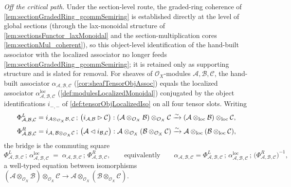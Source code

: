\begin{lemma}
  \label{lem:tensorObjAssoc_eq_localizedAssociator}
  \emph{Off the critical path.} Under the section-level route, the graded-ring
  coherence of \cref{lem:sectionGradedRing_gcommSemiring} is established directly
  at the level of global sections (through the lax-monoidal structure of
  \cref{lem:sectionsFunctor_laxMonoidal} and the section-multiplication cores
  \cref{lem:sectionMul_coherent}), so this object-level identification of the
  hand-built associator with the localized associator no longer feeds
  \cref{lem:sectionGradedRing_gcommSemiring}; it is retained only as supporting
  structure and is slated for removal.
  For sheaves of \(\mathcal{O}_X\)-modules \(\mathcal{A}, \mathcal{B},
  \mathcal{C}\), the hand-built associator
  \(\alpha_{\mathcal{A},\mathcal{B},\mathcal{C}}\) (\cref{cor:sheafTensorObjAssoc})
  equals the localized associator
  \(\alpha^{\mathrm{loc}}_{\mathcal{A},\mathcal{B},\mathcal{C}}\)
  (\cref{def:modulesLocalizedMonoidal}) conjugated by the object identifications
  \(i_{-,-}\) of \cref{def:tensorObjLocalizedIso} on all four tensor slots. Writing
  \[
    \Phi^{L}_{\mathcal{A},\mathcal{B},\mathcal{C}}
      = i_{\mathcal{A} \otimes_{\mathcal{O}_X} \mathcal{B},\,\mathcal{C}}
        \,;\, \bigl(i_{\mathcal{A},\mathcal{B}} \rhd \mathcal{C}\bigr)
      : (\mathcal{A} \otimes_{\mathcal{O}_X} \mathcal{B})
          \otimes_{\mathcal{O}_X} \mathcal{C}
        \xrightarrow{\sim}
        (\mathcal{A} \mathbin{\otimes_{\mathrm{loc}}} \mathcal{B}) \mathbin{\otimes_{\mathrm{loc}}} \mathcal{C},
  \]
  \[
    \Phi^{R}_{\mathcal{A},\mathcal{B},\mathcal{C}}
      = i_{\mathcal{A},\,\mathcal{B} \otimes_{\mathcal{O}_X} \mathcal{C}}
        \,;\, \bigl(\mathcal{A} \lhd i_{\mathcal{B},\mathcal{C}}\bigr)
      : \mathcal{A} \otimes_{\mathcal{O}_X}
          (\mathcal{B} \otimes_{\mathcal{O}_X} \mathcal{C})
        \xrightarrow{\sim}
        \mathcal{A} \mathbin{\otimes_{\mathrm{loc}}} (\mathcal{B} \mathbin{\otimes_{\mathrm{loc}}} \mathcal{C}),
  \]
  the bridge is the commuting square
  \[
    \Phi^{L}_{\mathcal{A},\mathcal{B},\mathcal{C}} \,;\,
      \alpha^{\mathrm{loc}}_{\mathcal{A},\mathcal{B},\mathcal{C}}
      \;=\;
      \alpha_{\mathcal{A},\mathcal{B},\mathcal{C}} \,;\,
      \Phi^{R}_{\mathcal{A},\mathcal{B},\mathcal{C}},
    \qquad\text{equivalently}\qquad
    \alpha_{\mathcal{A},\mathcal{B},\mathcal{C}}
      = \Phi^{L}_{\mathcal{A},\mathcal{B},\mathcal{C}} \,;\,
        \alpha^{\mathrm{loc}}_{\mathcal{A},\mathcal{B},\mathcal{C}} \,;\,
        \bigl(\Phi^{R}_{\mathcal{A},\mathcal{B},\mathcal{C}}\bigr)^{-1},
  \]
  a well-typed equation between isomorphisms
  \((\mathcal{A} \otimes_{\mathcal{O}_X} \mathcal{B}) \otimes_{\mathcal{O}_X}
  \mathcal{C} \to \mathcal{A} \otimes_{\mathcal{O}_X}
  (\mathcal{B} \otimes_{\mathcal{O}_X} \mathcal{C})\).
\end{lemma}

